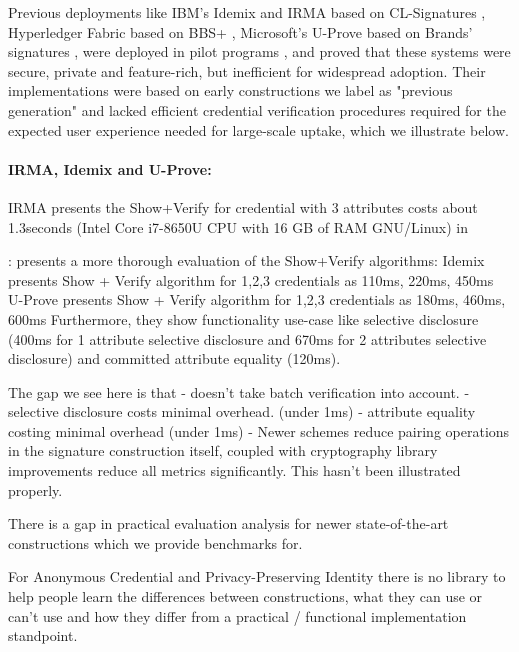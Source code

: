 Previous deployments like IBM's Idemix \cite{camenisch_design_2002} and IRMA \cite{fischer-hubner_towards_2013} based on CL-Signatures \cite{camenisch_design_2002, cimato_signature_2003}, Hyperledger Fabric \cite{androulaki_hyperledger_2018} based on BBS+ \cite{hutchison_constant-size_2006}, Microsoft's U-Prove \cite{dunkelman_formal_2016} based on Brands' signatures \cite{brands_rethinking_2000}, were deployed in pilot programs \cite{dunkelman_formal_2016}, and proved that these systems were secure, private and feature-rich, but inefficient for widespread adoption. Their implementations were based on early constructions we label as "previous generation" and lacked efficient credential verification procedures required for the expected user experience needed for large-scale uptake, which we illustrate below.

\paragraph{IRMA, Idemix and U-Prove: }

IRMA \cite{fischer-hubner_towards_2013} presents the Show+Verify for credential with 3 attributes costs about 1.3seconds (Intel Core i7-8650U CPU with 16 GB of RAM GNU/Linux) in \cite{zhang_passo_2021}

\cite{habib_evaluation_2016}: presents a more thorough evaluation of the Show+Verify algorithms:
Idemix presents Show + Verify algorithm for 1,2,3 credentials as 110ms, 220ms, 450ms
U-Prove presents Show + Verify algorithm for 1,2,3 credentials as 180ms, 460ms, 600ms
Furthermore, they show functionality use-case like selective disclosure (400ms for 1 attribute selective disclosure and 670ms for 2 attributes selective disclosure) and committed attribute equality (120ms). 

The gap we see here is that 
- doesn't take batch verification into account.
- selective disclosure costs minimal overhead. (under 1ms)
- attribute equality costing minimal overhead (under 1ms)
- Newer schemes \cite{camenisch_anonymous_2016, tomescu_utt_2022} reduce pairing operations in the signature construction itself, coupled with cryptography library improvements reduce all metrics significantly. 
This hasn't been illustrated properly. 

There is a gap in practical evaluation analysis for newer state-of-the-art constructions which we provide benchmarks for.



For Anonymous Credential and Privacy-Preserving Identity there is no library to help people learn the differences between constructions, what they can use or can't use and how they differ from a practical / functional implementation standpoint. 

